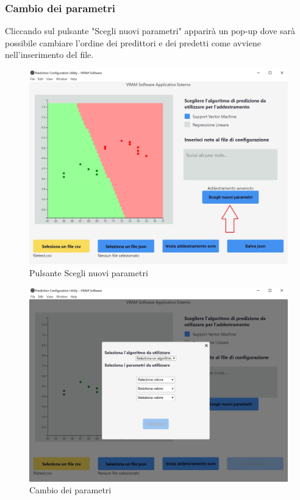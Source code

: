		\subsubsection{Cambio dei parametri}
		Cliccando sul pulsante "Scegli nuovi parametri" apparirà un pop-up dove sarà possibile cambiare l'ordine dei predittori e dei predetti come avviene nell'inserimento del file.
		\mbox{}
		\begin{figure} [H]
			\begin{center}
				\includegraphics[width=\linewidth]{./img/4-1.jpg}
			\end{center}
			\caption{Pulsante Scegli nuovi parametri}
		\end{figure}
		\mbox{}
		\mbox{}
		\begin{figure} [H]
			\begin{center}
				\includegraphics[width=\linewidth]{./img/3.jpg}
			\end{center}
			\caption{Cambio dei parametri}
		\end{figure}
		\mbox{}
